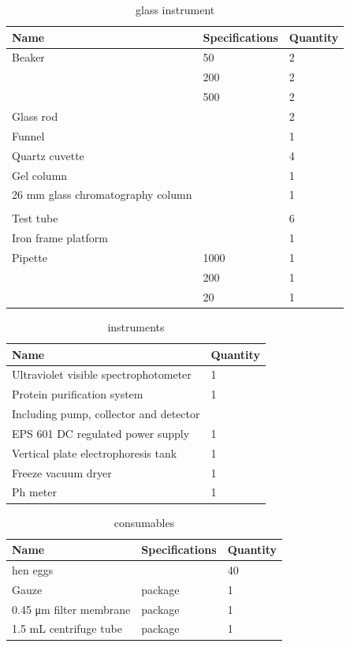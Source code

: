 \begin{table}[!h]
	\centering
	\caption{glass instrument}
    \begin{tabular}{lll}
    \toprule
	Name & Specifications & Quantity \\
	\midrule
	Beaker & 50    & 2 \\
	& 200   & 2 \\
	& 500   & 2 \\
	Glass rod &       & 2 \\
	Funnel &       & 1 \\
	Quartz cuvette &       & 4 \\
	Gel column &       & 1 \\
	26 mm glass chromatography column &       & 1 \\
	&       &  \\
	Test tube &       & 6 \\
	Iron frame platform &       & 1 \\
	Pipette & 1000  & 1 \\
	& 200   & 1 \\
	& 20    & 1 \\
	\bottomrule
	\end{tabular}%
\label{tab:glass}%
\end{table}%

\begin{table}[!h]
  \centering
\caption{instruments}
\begin{tabular}{ll}
	\toprule
	Name & Quantity \\
	\midrule
	Ultraviolet visible spectrophotometer & 1 \\
	Protein purification system & 1 \\
	Including pump, collector and detector &  \\
	EPS 601 DC regulated power supply & 1 \\
	Vertical plate electrophoresis tank & 1 \\
	Freeze vacuum dryer & 1 \\
	Ph meter & 1 \\
	\bottomrule
\end{tabular}%
\label{tab:instrument}%
\end{table}%

\begin{table}[!h]
  \centering
\caption{consumables}
\begin{tabular}{lll}
	\toprule
	 Name & Specifications & Quantity \\
	 \midrule
	hen eggs &       & 40 \\
	Gauze & package & 1 \\
	0.45 μm filter membrane & package & 1 \\
	1.5 mL centrifuge tube & package & 1 \\
		\bottomrule
\end{tabular}%
\label{tab:consumables}%
\end{table}%


